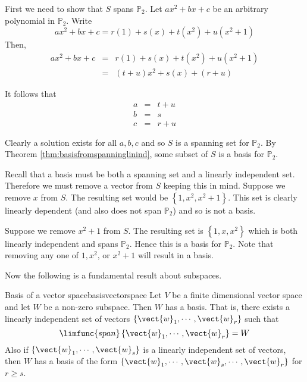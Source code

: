 \begin{solution}
First we need to show that $S$ spans $\mathbb{P}_2$. Let $ax^2 + bx + c$ be an arbitrary polynomial in $\mathbb{P}_2$. Write 
\[
ax^2 + bx + c = r(1) + s(x) + t(x^2) + u (x^2 + 1)
\]
Then,
\begin{eqnarray*}
ax^2 +bx + c &=& r(1) + s(x) + t(x^2) + u (x^2 + 1) \\
&=& (t+u) x^2 + s(x) + (r+u) 
\end{eqnarray*}

It follows that 
\begin{eqnarray*}
a &=& t + u \\
b &=& s \\
c &=& r + u 
\end{eqnarray*}

Clearly a solution exists for all $a,b,c$ and so $S$ is a spanning set for $\mathbb{P}_2$. By Theorem \ref{thm:basisfromspanninglinind}, some subset of $S$ is a basis for $\mathbb{P}_2$. 

Recall that a basis must be both a spanning set and a linearly independent set.
Therefore we must remove a vector from $S$ keeping this in mind. Suppose we remove $x$ from $S$. The resulting set would be $\left\{ 1, x^2, x^2 + 1 \right\}$. This set is clearly linearly dependent (and also does not span $\mathbb{P}_2$) and so is not a basis. 

Suppose we remove $x^2 + 1$ from $S$. The resulting set is $\left\{ 1, x, x^2 \right\}$ which is both linearly independent and spans $\mathbb{P}_2$. Hence this is a basis for $\mathbb{P}_2$. Note that removing any one of $1, x^2$, or $x^2 + 1$ will result in a basis.
\end{solution}

Now the following is a fundamental result about subspaces.

\begin{theorem}{Basis of a vector space}{basisvectorspace}
Let $V$ be a finite dimensional vector space and let $W$ be
a non-zero subspace. Then $W$ has a basis. That is, there exists a linearly
independent set of vectors $\left\{ \vect{w}_{1},\cdots ,\vect{w}_{r}\right\} $
such that 
\begin{equation*}
\limfunc{span}\left\{ \vect{w}_{1},\cdots ,\vect{w}_{r}\right\} =W
\end{equation*}
Also if $\left\{ \vect{w}_{1},\cdots ,\vect{w}_{s}\right\} $ is a linearly
independent set of vectors, then $W$ has a basis of the form $\left\{ \vect{w}
_{1},\cdots ,\vect{w}_{s},\cdots ,\vect{w}_{r}\right\} $ for $r\geq s$.
\end{theorem}

